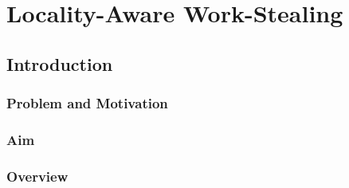
\part{Locality-Aware Work-Stealing}
\label{part:locality}

\chapter{Introduction}
\label{chap:locality-introduction}


\section{Problem and Motivation}
\label{sec:locality-intro-problem-and-motivation}


\section{Aim}
\label{sec:locality-intro-aim}


\section{Overview}
\label{sec:locality-intro-overview}


